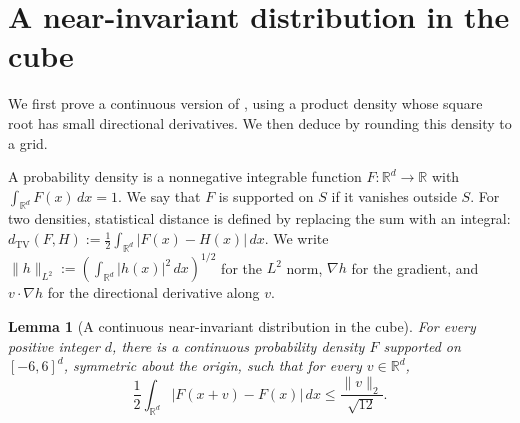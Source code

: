 \documentclass{article}
\newtheorem{lemma}[theorem]{Lemma}
\newcommand{\R}{\mathbb{R}}
\newcommand{\SD}[2]{d_{\mathrm{TV}}(#1,#2)}
\begin{document}
\section{A near-invariant distribution in the cube}
\label{sec:cube}

We first prove a continuous version of , using
a product density whose square root has small directional
derivatives. We then deduce  by rounding this
density to a grid.

A probability density is a nonnegative integrable function
$F:\R^d\to\R$ with $\int_{\R^d}F(x)\,dx=1$.
We say that $F$ is supported on $S$ if it vanishes outside $S$.
For two densities, statistical distance is defined by replacing
the sum with an integral:
$\SD{F}{H}:=\frac12\int_{\R^d}|F(x)-H(x)|\,dx$.
We write $\|h\|_{L^2}:=(\int_{\R^d}|h(x)|^2\,dx)^{1/2}$ for the
$L^2$ norm, $\nabla h$ for the gradient, and $v\cdot\nabla h$ for
the directional derivative along $v$.

\begin{lemma}[A continuous near-invariant distribution in the cube]
\label{lemma:continuous-cube}
For every positive integer $d$, there is a continuous probability
density $F$ supported on $[-6,6]^d$, symmetric about the origin,
such that for every $v\in\R^d$,
\[
\frac12\int_{\R^d}|F(x+v)-F(x)|\,dx
\le\frac{\|v\|_2}{\sqrt{12}}.
\]
\end{lemma}
\end{document}
